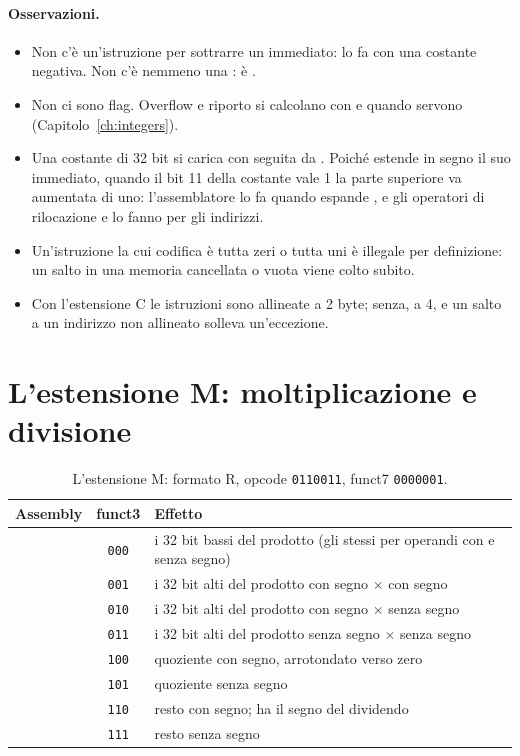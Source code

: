 \paragraph{Osservazioni.}
\begin{itemize}
\item Non c'è un'istruzione per sottrarre un immediato: lo fa  con
  una costante negativa. Non c'è nemmeno una : è
  .
\item Non ci sono flag. Overflow e riporto si calcolano con  e
   quando servono (Capitolo~\ref{ch:integers}).
\item Una costante di 32 bit si carica con  seguita da .
  Poiché  estende in segno il suo immediato, quando il bit 11 della
  costante vale 1 la parte superiore va aumentata di uno: l'assemblatore lo fa
  quando espande , e gli operatori di rilocazione  e
   lo fanno per gli indirizzi.
\item Un'istruzione la cui codifica è tutta zeri o tutta uni è illegale per
  definizione: un salto in una memoria cancellata o vuota viene colto subito.
\item Con l'estensione C le istruzioni sono allineate a 2 byte; senza, a 4, e
  un salto a un indirizzo non allineato solleva un'eccezione.
\end{itemize}

\section{L'estensione M: moltiplicazione e divisione}

\begin{table}[htb]
\centering\small
\caption{L'estensione M: formato R, opcode \texttt{0110011}, funct7
\texttt{0000001}.}\label{tab:rv:m}
\begin{tabularx}{\textwidth}{@{}lcL@{}}
\toprule
\textbf{Assembly} & \textbf{funct3} & \textbf{Effetto}\\
\midrule
{} & \texttt{000} & i 32 bit bassi del prodotto (gli stessi per operandi con e senza segno)\\
 & \texttt{001} & i 32 bit alti del prodotto con segno $\times$ con segno\\
 & \texttt{010} & i 32 bit alti del prodotto con segno $\times$ senza segno\\
 & \texttt{011} & i 32 bit alti del prodotto senza segno $\times$ senza segno\\
 & \texttt{100} & quoziente con segno, arrotondato verso zero\\
 & \texttt{101} & quoziente senza segno\\
 & \texttt{110} & resto con segno; ha il segno del dividendo\\
 & \texttt{111} & resto senza segno\\
\bottomrule
\end{tabularx}
\end{table}

